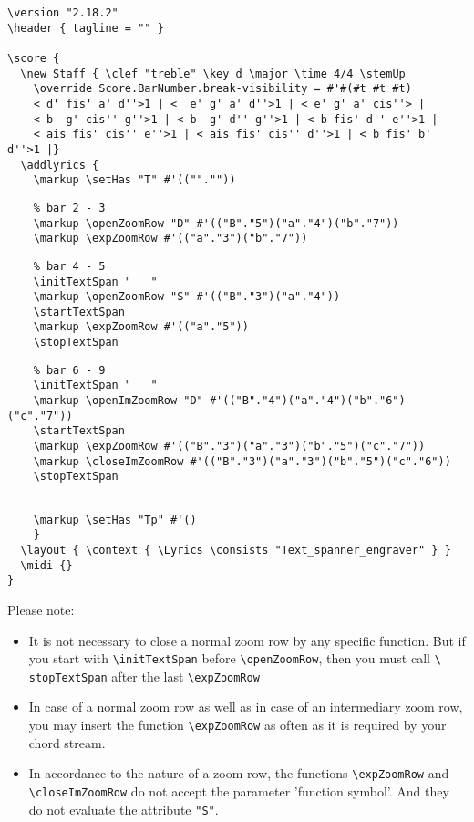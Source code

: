 \documentclass[
  DIV=calc,
  BCOR=5mm,
  12pt,
  headings=small,
  oneside,
  abstract=true,
  toc=bib,
  xcolor=dvipsnames,
  openany,
  ngerman,english]{scrartcl}
\begin{document}
\begin{scriptsize}
\begin{verbatim}
\version "2.18.2"
\header { tagline = "" }

\score {
  \new Staff { \clef "treble" \key d \major \time 4/4 \stemUp 
    \override Score.BarNumber.break-visibility = #'#(#t #t #t)
    < d' fis' a' d''>1 | <  e' g' a' d''>1 | < e' g' a' cis''> |
    < b  g' cis'' g''>1 | < b  g' d'' g''>1 | < b fis' d'' e''>1 | 
    < ais fis' cis'' e''>1 | < ais fis' cis'' d''>1 | < b fis' b' d''>1 |}
  \addlyrics { 
    \markup \setHas "T" #'((""."")) 
\end{verbatim}
\color{red}
\begin{verbatim} 
    % bar 2 - 3
    \markup \openZoomRow "D" #'(("B"."5")("a"."4")("b"."7"))
    \markup \expZoomRow #'(("a"."3")("b"."7")) 
\end{verbatim}
\color{blue}
\begin{verbatim} 
    % bar 4 - 5
    \initTextSpan "   "
    \markup \openZoomRow "S" #'(("B"."3")("a"."4"))
    \startTextSpan
    \markup \expZoomRow #'(("a"."5")) 
    \stopTextSpan
\end{verbatim}
\color{magenta}
\begin{verbatim} 
    % bar 6 - 9
    \initTextSpan "   "
    \markup \openImZoomRow "D" #'(("B"."4")("a"."4")("b"."6")("c"."7"))
    \startTextSpan
    \markup \expZoomRow #'(("B"."3")("a"."3")("b"."5")("c"."7")) 
    \markup \closeImZoomRow #'(("B"."3")("a"."3")("b"."5")("c"."6")) 
    \stopTextSpan 
\end{verbatim}
\color{black}
\begin{verbatim} 
        
    \markup \setHas "Tp" #'() 
    }
  \layout { \context { \Lyrics \consists "Text_spanner_engraver" } }
  \midi {}
}
\end{verbatim}
\end{scriptsize}

Please note:
\begin{itemize}
  \item It is not necessary to close a normal zoom row by any specific function.
  But if you start with \texttt{\textbackslash initTextSpan} before
  \texttt{\textbackslash openZoomRow}, then you must call \texttt{\textbackslash
  stopTextSpan} after the last \texttt{\textbackslash expZoomRow}
  \item In case of a normal zoom row as well as in case of an intermediary zoom
  row, you may insert the function \texttt{\textbackslash expZoomRow} as often as
  it is required by your chord stream.
  \item In accordance to the nature of a zoom row, the functions
  \texttt{\textbackslash expZoomRow} and \texttt{\textbackslash closeImZoomRow}
  do not accept the parameter 'function symbol'. And they do not evaluate the
  attribute \texttt{"S"}.
\end{itemize}
\end{document}

